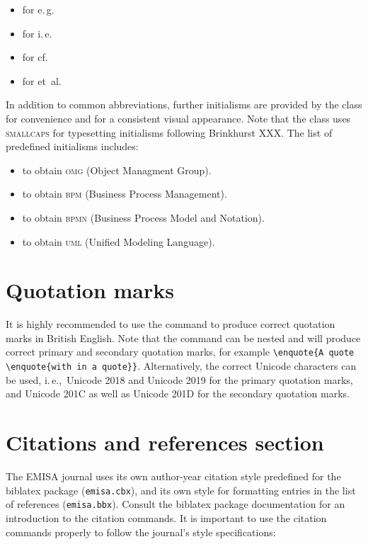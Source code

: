 \documentclass[a4paper]{ltxdoc}
\providecommand*\pkg[1]{\textsf{#1}}
\begin{document}
\begin{itemize}
\item {} for e.\,g.
\item {} for i.\,e.
\item {} for cf.
\item {} for et~al.
\end{itemize}


\DescribeMacro{\OMG}\DescribeMacro{\BPM}\DescribeMacro{\BPMN}\DescribeMacro{\UML}%
In addition to common abbreviations, further initialisms are provided by the class for convenience and for a consistent visual appearance. Note that the class uses \textsc{smallcaps} for typesetting initialisms following Brinkhurst XXX. The list of predefined initialisms includes:

\begin{itemize}
\item {} to obtain \textsc{omg} (Object Managment Group).
\item {} to obtain \textsc{bpm} (Business Process Management).
\item {} to obtain \textsc{bpmn} (Business Process Model and Notation).
\item {} to obtain \textsc{uml} (Unified Modeling Language).
\end{itemize}





\section{Quotation marks}
\DescribeMacro{\enquote}%
It is highly recommended to use the  command to produce correct quotation marks in British English. Note that the command can be nested and will produce correct primary and secondary quotation marks, for example \verb|\enquote{A quote \enquote{with in a quote}}|.
Alternatively, the correct Unicode characters can be used, i.\,e.,\ Unicode 2018 and Unicode 2019 for the primary quotation marks, and Unicode 201C as well as Unicode 201D for the secondary quotation marks.






\section{Citations and references section}
\DescribeMacro{\parencite}\DescribeMacro{\textcite}\DescribeMacro{\cite}%
The EMISA journal uses its own author-year citation style predefined for the \pkg{biblatex} package (\verb|emisa.cbx|), and its own style for formatting entries in the list of references (\verb|emisa.bbx|). Consult the  \pkg{biblatex} package documentation for an introduction to the citation commands.
 It is important to use the citation commands properly to follow the journal's style specifications:
\end{document}
